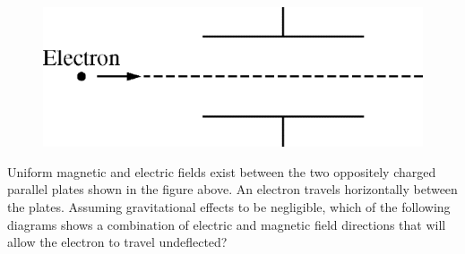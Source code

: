 \begin{figure}[H]
\centering
\includegraphics[scale=0.4]{images/img-013-029.png}
\end{figure}

\begin{questions}\setcounter{question}{30}\question
Uniform magnetic and electric fields exist between the two oppositely charged parallel plates shown in the figure above. An electron travels horizontally between the plates. Assuming gravitational effects to be negligible, which of the following diagrams shows a combination of electric and magnetic field directions that will allow the electron to travel undeflected?


\end{questions}
